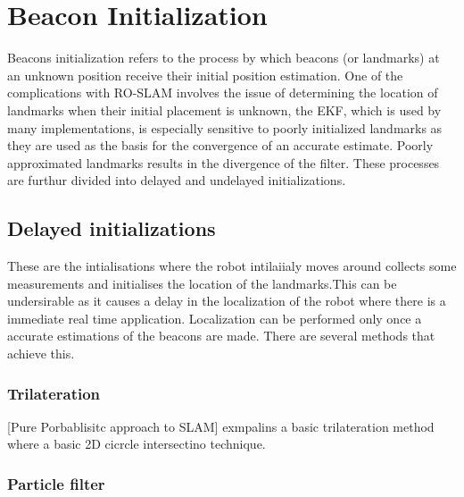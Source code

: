 \documentclass[conference]{IEEEtran}
\begin{document}
	
	
	

	
	


	


	\section{Beacon Initialization}
	Beacons initialization refers to the process by which beacons (or landmarks) at an unknown position receive their initial position estimation. One of the complications with RO-SLAM involves the issue of determining the location of landmarks when their initial placement is unknown, the EKF, which is used by many implementations, is especially sensitive to poorly initialized landmarks as they are used as the basis for the convergence of an accurate estimate. Poorly approximated landmarks results in the divergence of the filter. These processes are furthur  divided into delayed and undelayed initializations.
	\subsection{Delayed initializations}
	These are the intialisations where  the robot intilaiialy moves around collects some measurements and initialises the location of the landmarks.This can be undersirable as it causes a delay in the localization of the robot where there is a immediate real time application. Localization can be performed only once a accurate estimations of the beacons are made. There are several methods that achieve this. 
	\subsubsection{Trilateration}
	[Pure Porbablisitc approach to SLAM] exmpalins a basic trilateration method where a basic 2D cicrcle intersectino technique. %
	\subsubsection{Particle filter}
	
	
	
\end{document}
